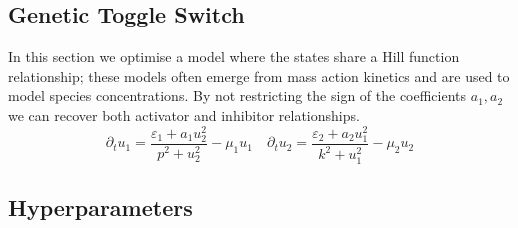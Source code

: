 \subsection{Genetic Toggle Switch}
In this section we optimise a model where the states share a Hill function relationship; these models often emerge from mass action kinetics and are used to model species concentrations. By not restricting the sign of the coefficients $a_1,a_2$ we can recover both activator and inhibitor relationships.
\begin{equation}
    \partial_t u_1 = \frac{\varepsilon_1 + a_1 u_2^2} { p^2 + u_2^2 } - \mu_1 u_1 \quad
    \partial_t u_2 = \frac{\varepsilon_2 + a_2 u_1^2} { k^2 + u_1^2 } - \mu_2 u_2
\end{equation}


\subsection{Hyperparameters}







